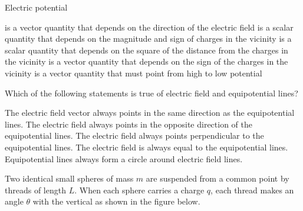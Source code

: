 \documentclass{../../../oss-ap12ibhl}
\begin{document}
\begin{questions}
  \question Electric potential
  \begin{choices}
    \choice is a vector quantity that depends on the direction of the electric
    field
    \choice is a scalar quantity that depends on the magnitude and sign of
    charges in the vicinity
    \choice is a scalar quantity that depends on the square of the distance from
    the charges in the vicinity
    \choice is a vector quantity that depends on the sign of the charges in the
    vicinity
    \choice is a vector quantity that must point from high to low potential
  \end{choices}

  \question Which of the following statements is true of electric field and
  equipotential lines?
  \begin{choices}
    \choice The electric field vector always points in the same direction as the
    equipotential lines.
    \choice The electric field always points in the opposite direction of the
    equipotential lines.
    \choice The electric field always points perpendicular to the equipotential
    lines.
    \choice The electric field is always equal to the equipotential lines.
    \choice Equipotential lines always form a circle around electric field
    lines.
  \end{choices}

  \question Two identical small spheres of mass $m$ are suspended from a common
  point by threads of length $L$. When each sphere carries a charge $q$, each
  thread makes an angle $\theta$ with the vertical as shown in the figure below.
  \begin{parts}

\end{parts}
\end{questions}
\end{document}
